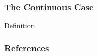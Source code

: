 \documentclass{beamer}
\begin{document}
\begin{frame}
    \frametitle{The Continuous Case}

    \begin{block}{Definition}
        
    \end{block}

\end{frame}


\begin{frame}
    \frametitle{References}
\end{frame}
\end{document}
